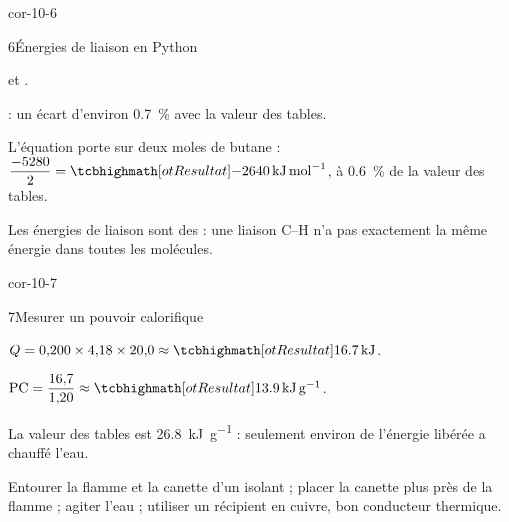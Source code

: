 \begin{blocLivre}{cor-10-6}
\begin{corrige}{6}{Énergies de liaison en Python}
\begin{questions}
\item {} et .
\item {} : un écart d'environ \qty{0,7}{\percent} avec la valeur des tables.
\item L'équation porte sur deux moles de butane : $\dfrac{-5280}{2}=\res{\qty{-2640}{kJ.mol^{-1}}}$, à \qty{0,6}{\percent} de la valeur des tables.
\item Les énergies de liaison sont des  : une liaison C--H n'a pas exactement la même énergie dans toutes
les molécules.
\end{questions}
\end{corrige}
\end{blocLivre}
\begin{blocLivre}{cor-10-7}
\begin{corrige}{7}{Mesurer un pouvoir calorifique}
\begin{questions}
\item $Q=0{,}200\times4{,}18\times20{,}0\approx\res{\qty{16,7}{kJ}}$.
\item $\mathrm{PC}=\dfrac{16{,}7}{1{,}20}\approx\res{\qty{13,9}{kJ.g^{-1}}}$.
\item La valeur des tables est \qty{26,8}{kJ.g^{-1}} : seulement  environ de l'énergie libérée a chauffé l'eau.
\item Entourer la flamme et la canette d'un  isolant ; placer la canette plus près de la flamme ; agiter l'eau ; utiliser
un récipient en cuivre, bon conducteur thermique.
\end{questions}
\end{corrige}
\end{blocLivre}
